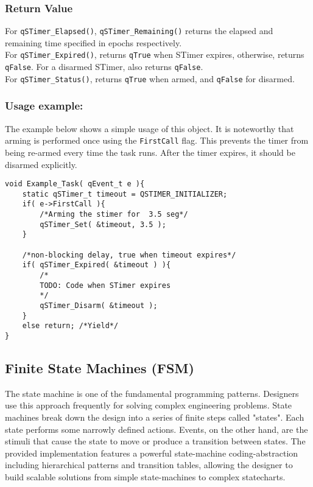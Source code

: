 \subsubsection*{Return Value}
For \lstinline{qSTimer_Elapsed()}, \lstinline{qSTimer_Remaining()} returns the elapsed and remaining time specified in epochs respectively. \\
For \lstinline{qSTimer_Expired()}, returns \lstinline{qTrue} when STimer expires, otherwise, returns \lstinline{qFalse}. For a disarmed STimer, also returns \lstinline{qFalse}. \\
For \lstinline{qSTimer_Status()}, returns \lstinline{qTrue} when armed, and \lstinline{qFalse} for disarmed.

\noindent\hrulefill

\subsubsection*{Usage example:}
The example below shows a simple usage of this object. It is noteworthy that arming is performed once using the \lstinline{FirstCall} flag. This prevents the timer from being re-armed every time the task runs. After the timer expires, it should be disarmed explicitly. \\


\begin{lstlisting}[style=CStyle]
void Example_Task( qEvent_t e ){
    static qSTimer_t timeout = QSTIMER_INITIALIZER;
    if( e->FirstCall ){
        /*Arming the stimer for  3.5 seg*/
        qSTimer_Set( &timeout, 3.5 );
    }
    
    /*non-blocking delay, true when timeout expires*/
    if( qSTimer_Expired( &timeout ) ){
        /*
        TODO: Code when STimer expires
        */    
        qSTimer_Disarm( &timeout );
    }
    else return; /*Yield*/
}
\end{lstlisting}  

\subsection{Finite State Machines (FSM)}
The state machine is one of the fundamental programming patterns. Designers use this approach frequently for solving complex engineering problems. State machines break down the design into a series of finite steps called "states". Each state performs some narrowly defined actions. Events, on the other hand, are the stimuli that cause the state to move or produce a transition between states. 
The provided implementation features a powerful state-machine coding-abstraction including hierarchical patterns and transition tables, allowing the designer to build scalable solutions from simple state-machines to complex statecharts. 

